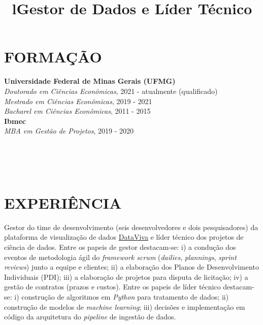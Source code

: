 \documentclass[margin]{res}
\begin{document}
\begin{resume}

\section{FORMAÇÃO}
\textbf{Universidade Federal de Minas Gerais (UFMG)}\\
{\sl Doutorado em Ciências Econômicas}, 2021 - atualmente (qualificado)
\\
{\sl Mestrado em Ciências Econômicas}, 2019 - 2021
\\
{\sl Bacharel em Ciências Econômicas}, 2011 - 2015
\\
\textbf{Ibmec}\\
{\sl MBA em Gestão de Projetos}, 2019 - 2020
\\



\begin{format}
\title{l}\\
\\
\body\\
\end{format}

\section{EXPERIÊNCIA}

\title{\textbf{Gestor de Dados e Líder Técnico}}
\begin{position}
Gestor do time de desenvolvimento (seis desenvolvedores e dois pesquisadores) da plataforma de visualização de dados \href{https://www.dataviva.info/pt/}{DataViva} e líder técnico dos projetos de ciência de dados. Entre os papeis de gestor destacam-se: i) a condução dos eventos de metodologia ágil do \textit{framework scrum} (\textit{dailies}, \textit{plannings}, \textit{sprint reviews}) junto a equipe e clientes; ii) a elaboração dos Planos de Desenvolvimento Individuais (PDI); iii) a elaboração de projetos para disputa de licitação; iv) a gestão de contratos (prazos e custos). Entre os papeis de líder técnico destacam-se: i) construção de algoritmos em \textit{Python} para tratamento de dados; ii) construção de modelos de \textit{machine learning}; iii) decisões e implementação em código da arquitetura do \textit{pipeline} de ingestão de dados.
\end{position}


\end{resume}
\end{document}
